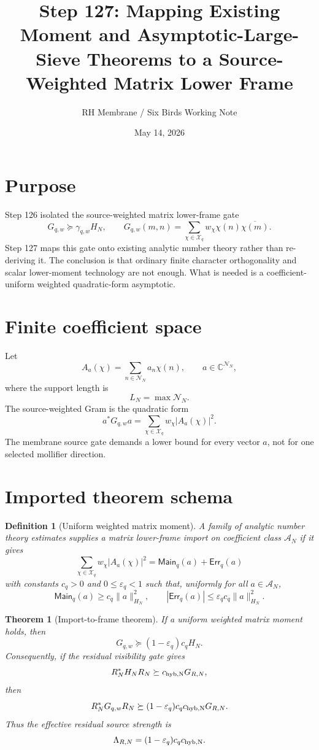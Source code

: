 \documentclass[11pt]{article}
\title{Step 127: Mapping Existing Moment and Asymptotic-Large-Sieve Theorems to a Source-Weighted Matrix Lower Frame}
\author{RH Membrane / Six Birds Working Note}
\date{May 14, 2026}
\newtheorem{theorem}{Theorem}
\newtheorem{definition}{Definition}
\begin{document}
\maketitle

\section{Purpose}
Step 126 isolated the source-weighted matrix lower-frame gate
\[
G_{q,w}\succeq \gamma_{q,w}H_N,
\qquad
G_{q,w}(m,n)=\sum_{\chi\in\mathcal X_q} w_\chi \chi(n)\overline{\chi(m)}.
\]
Step 127 maps this gate onto existing analytic number theory rather than re-deriving it.  The conclusion is that ordinary finite character orthogonality and scalar lower-moment technology are not enough.  What is needed is a coefficient-uniform weighted quadratic-form asymptotic.

\section{Finite coefficient space}
Let
\[
A_a(\chi)=\sum_{n\in\mathcal N_N} a_n\chi(n),
\qquad a\in \mathbb C^{\mathcal N_N},
\]
where the support length is
\[
L_N=\max \mathcal N_N.
\]
The source-weighted Gram is the quadratic form
\[
a^*G_{q,w}a=\sum_{\chi\in\mathcal X_q} w_\chi |A_a(\chi)|^2.
\]
The membrane source gate demands a lower bound for every vector $a$, not for one selected mollifier direction.

\section{Imported theorem schema}
\begin{definition}[Uniform weighted matrix moment]
A family of analytic number theory estimates supplies a \emph{matrix lower-frame import} on coefficient class $\mathcal A_N$ if it gives
\[
\sum_{\chi\in\mathcal X_q} w_\chi |A_a(\chi)|^2
=
\mathsf{Main}_q(a)+\mathsf{Err}_q(a)
\]
with constants $c_q>0$ and $0\le \varepsilon_q<1$ such that, uniformly for all $a\in\mathcal A_N$,
\[
\mathsf{Main}_q(a)\ge c_q\|a\|_{H_N}^2,
\qquad
|\mathsf{Err}_q(a)|\le \varepsilon_q c_q\|a\|_{H_N}^2.
\]
\end{definition}

\begin{theorem}[Import-to-frame theorem]
If a uniform weighted matrix moment holds, then
\[
G_{q,w}\succeq (1-\varepsilon_q)c_qH_N.
\]
Consequently, if the residual visibility gate gives
\[
R_N^*H_NR_N\succeq c_{\rm hyb,N}G_{R,N},
\]
then
\[
R_N^*G_{q,w}R_N\succeq (1-\varepsilon_q)c_qc_{\rm hyb,N}G_{R,N}.
\]
Thus the effective residual source strength is
\[
\Lambda_{R,N}=(1-\varepsilon_q)c_qc_{\rm hyb,N}.
\]
\end{theorem}
\end{document}
